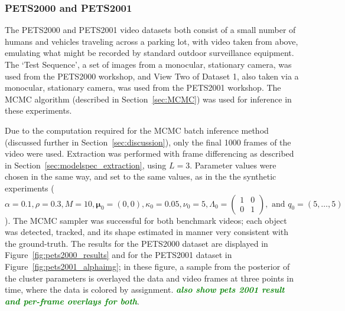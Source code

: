 \documentclass[smallcondensed, final]{svjour3}
\newcommand{\willie}[1]{\textcolor{green}{\textsf{\emph{\textbf{\textcolor{green}{#1}}}}}}
\begin{document}

\subsubsection{PETS2000 and PETS2001}
\label{sec:pets2000_2001}

The PETS2000 and PETS2001 video datasets both consist of a small number of humans and vehicles traveling across a parking lot, with video taken from above, emulating what might be recorded by standard outdoor surveillance equipment. The `Test Sequence', a set of images from a monocular, stationary camera, was used from the PETS2000 workshop, and View Two of Dataset 1, also taken via a monocular, stationary camera, was used from the PETS2001 workshop. The MCMC algorithm (described in Section~\ref{sec:MCMC}) was used for inference in these experiments.

Due to the computation required for the MCMC batch inference method (discussed further in Section~\ref{sec:discussion}), only the final 1000 frames of the video were used. Extraction was performed with frame differencing as described in Section~\ref{sec:modelspec_extraction}, using $L=3$. Parameter values were chosen in the same way, and set to the same values, as in the the synthetic experiments ($\alpha = 0.1, \rho = 0.3, M = 10, \boldsymbol{\mu}_{0} = (0,0), \kappa_{0} = 0.05, \nu_{0} = 5, \Lambda_{0} = \left( \begin{smallmatrix} 1&0\\ 0&1 \end{smallmatrix} \right), \text{ and } q_{0} = (5, \ldots, 5)$). The MCMC sampler was successful for both benchmark videos; each object was detected, tracked, and its shape estimated in manner very consistent with the ground-truth. The results for the PETS2000 dataset are displayed in Figure~\ref{fig:pets2000_results} and for the PETS2001 dataset in Figure~\ref{fig:pets2001_alphaimg}; in these figure, a sample from the posterior of the cluster parameters is overlayed the data and video frames at three points in time, where the data is colored by assignment. \willie{also show pets 2001 result and per-frame overlays for both}.
\end{document}
